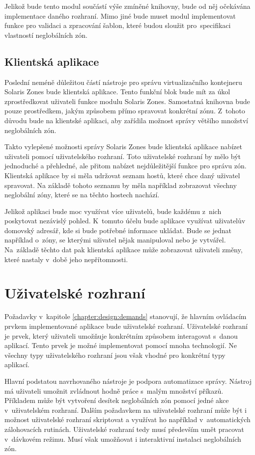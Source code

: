 Jelikož bude tento modul součástí výše zmíněné knihovny, bude od něj očekávána implementace daného rozhraní. Mimo jiné 
bude muset modul implementovat funkce pro validaci a zpracování šablon, které budou sloužit pro~specifikaci vlastností
neglobálních zón.
\subsection{Klientská aplikace}
\label{chapter:design:architecture:client}
Poslední neméně důležitou částí nástroje pro správu virtualizačního kontejneru Solaris Zones bude klientská aplikace. Tento
funkční blok bude mít za úkol zprostředkovat uživateli funkce modulu Solaris Zones. Samostatná knihovna bude pouze prostředkem,
jakým způsobem přímo spravovat konkrétní zónu. Z~tohoto důvodu bude na klientské aplikaci, aby zařídila možnost správy většího
množství neglobálních zón.

Takto vylepšené možnosti správy Solaris Zones bude klientská aplikace nabízet uživateli pomocí uživatelského rozhraní. Toto
uživatelské rozhraní by mělo být jednoduché a přehledné, ale přitom nabízet nejdůležitější funkce pro správu zón. Klientská
aplikace by si měla udržovat seznam hostů, které chce daný uživatel spravovat. Na základě tohoto seznamu by měla například
zobrazovat všechny neglobální zóny, které se na těchto hostech nachází.

Jelikož aplikaci bude moc využívat více uživatelů, bude každému z~nich poskytovat nezávislý pohled. K~tomuto účelu bude aplikace
využívat uživatelův domovský adresář, kde si bude potřebné informace ukládat. Bude se jednat například o~zóny, se kterými
uživatel nějak manipuloval nebo je vytvářel. Na~základě těchto dat pak klientská aplikace může zobrazovat uživateli změny,
které nastaly v~době jeho nepřítomnosti.
\section{Uživatelské rozhraní}
\label{chapter:design:ui}
Požadavky v~kapitole \ref{chapter:design:demands} stanovují, že hlavním ovládacím prvkem implementované aplikace bude
uživatelské rozhraní. Uživatelské rozhraní je prvek, který uživateli umožňuje konkrétním způsobem interagovat s~danou aplikací.
Tento prvek je možné implementovat pomocí mnoha technologií. Ne všechny typy uživatelského rozhraní jsou však vhodné pro 
konkrétní typy aplikací.

Hlavní podstatou navrhovaného nástroje je podpora automatizace správy. Nástroj má uživateli umožnit zvládnout
hodně práce s~malým množství příkazů. Příkladem může být vytvoření desítek neglobálních zón pomocí jedné akce v~uživatelském 
rozhraní. Dalším požadavkem na uživatelské rozhraní může být i možnost uživatelské rozhraní skriptovat a využívat ho například
v~automatických zálohovacích rutinách. Uživatelské rozhraní tedy musí především umět pracovat v~dávkovém režimu. Musí však
umožňovat i interaktivní instalaci neglobálních zón.

